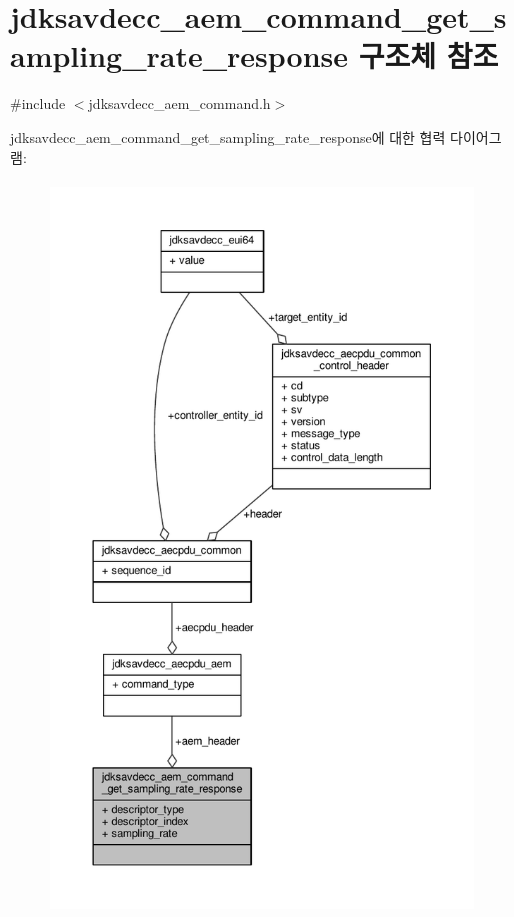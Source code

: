 \hypertarget{structjdksavdecc__aem__command__get__sampling__rate__response}{}\section{jdksavdecc\+\_\+aem\+\_\+command\+\_\+get\+\_\+sampling\+\_\+rate\+\_\+response 구조체 참조}
\label{structjdksavdecc__aem__command__get__sampling__rate__response}


{\ttfamily \#include $<$jdksavdecc\+\_\+aem\+\_\+command.\+h$>$}



jdksavdecc\+\_\+aem\+\_\+command\+\_\+get\+\_\+sampling\+\_\+rate\+\_\+response에 대한 협력 다이어그램\+:
\nopagebreak
\begin{figure}[H]
\begin{center}
\leavevmode
\includegraphics[height=550pt]{structjdksavdecc__aem__command__get__sampling__rate__response__coll__graph}
\end{center}
\end{figure}
